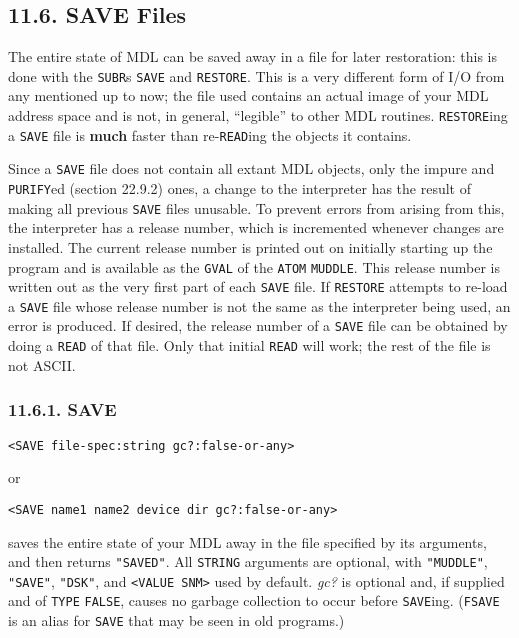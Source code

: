 \documentclass[a4paper,]{article}
\begin{document}
\subsection{11.6. SAVE Files}\label{save-files}

The entire state of MDL can be saved away in a file for later restoration: this is done with the \texttt{SUBR}s
\texttt{SAVE}  and \texttt{RESTORE}. This is a very different form of I/O from
any mentioned up to now; the file used contains an actual image of your MDL address space and is not, in general,
``legible'' to other MDL routines. \texttt{RESTORE}ing a \texttt{SAVE} file is \textbf{much} faster than
re-\texttt{READ}ing the objects it contains.

Since a \texttt{SAVE} file does not contain all extant MDL objects, only the impure and \texttt{PURIFY}ed
 (section 22.9.2) ones, a change to the interpreter has the result of making all previous
\texttt{SAVE} files unusable. To prevent errors from arising from this, the interpreter has a release number, which is
incremented whenever changes are installed. The current release number is printed out on initially starting up the program
and is available as the \texttt{GVAL} of the \texttt{ATOM} \texttt{MUDDLE}. This release
number is written out as the very first part of each \texttt{SAVE} file. If \texttt{RESTORE} attempts to re-load a
\texttt{SAVE} file whose release number is not the same as the interpreter being used, an error is produced. If desired,
the release number of a \texttt{SAVE} file can be obtained by doing a \texttt{READ} of that file. Only that initial
\texttt{READ} will work; the rest of the file is not ASCII.

\subsubsection{11.6.1. SAVE}\label{save}

\begin{verbatim}
<SAVE file-spec:string gc?:false-or-any>
\end{verbatim}

or

\begin{verbatim}
<SAVE name1 name2 device dir gc?:false-or-any>
\end{verbatim}

 saves the entire state of your MDL away in the file specified by its arguments, and then
returns \texttt{"SAVED"}. All \texttt{STRING} arguments are optional, with \texttt{"MUDDLE"},
 \texttt{"SAVE"},  \texttt{"DSK"},
 and \texttt{\textless{}VALUE\ SNM\textgreater{}}  used by default. \emph{gc?}
is optional and, if supplied and of \texttt{TYPE} \texttt{FALSE}, causes no garbage collection to occur before
\texttt{SAVE}ing. (\texttt{FSAVE}  is an alias for \texttt{SAVE} that may be seen in old programs.)
\end{document}
